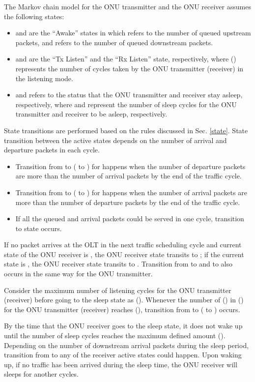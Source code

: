 \documentclass[11pt,english,12pt,onecolumn, draftcls]{IEEEtran}
\theoremstyle{plain}
\theoremstyle{definition}
\begin{document}
The Markov chain model for the ONU transmitter and the ONU receiver assumes the following states:
\begin{itemize}
\item  and  are the ``Awake'' states in which  refers to the number of queued  upstream packets, and  refers to the number of queued downstream packets.
\item  and  are the ``Tx Listen'' and the ``Rx Listen'' state, respectively, where  () represents the number of cycles taken by the ONU transmitter (receiver) in the listening mode.
\item  and  refers to the status that the ONU transmitter and receiver stay asleep, respectively, where  and  represent the number of sleep cycles for the ONU transmitter and receiver to be asleep, respectively.
\end{itemize}
State transitions are performed based on the rules discussed in Sec. \ref{state}. State transition between the active states depends on the number of arrival and departure packets in each cycle.
\begin{itemize}
\item Transition from  to  ( to ) for  happens when the number of departure packets are  more than the number of arrival packets by the end of the traffic cycle.
\item Transition from  to  ( to ) for  happens when the number of arrival packets are  more than the number of departure packets by the end of the traffic cycle.
\item If all the queued and arrival packets could be served in one cycle, transition to  state occurs.
\end{itemize}


If no packet arrives at the OLT in the next traffic scheduling cycle and current state of the ONU receiver is , the ONU receiver state transits to ; if the current state is , the ONU receiver state transits to . Transition from  to  and  to  also occurs in the same way for the ONU transmitter.

Consider the maximum number of listening cycles for the ONU transmitter (receiver) before going to the sleep state as  (). Whenever the number of  () in  () for the ONU transmitter (receiver) reaches  (), transition from  to  ( to ) occurs.

By the time that the ONU receiver goes to the sleep state, it does not wake up until the number of sleep cycles reaches the maximum defined amount (). Depending on the number of downstream arrival packets during the sleep period, transition from  to any of the receiver active states  could happen. Upon waking up, if no traffic has been arrived during the sleep time, the ONU receiver will sleeps for another  cycles.
\end{document}
